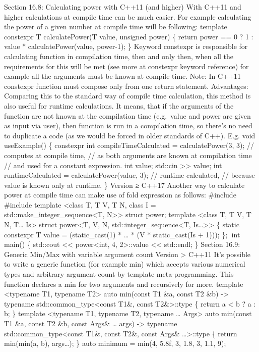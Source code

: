 Section 16.8: Calculating power with C++11 (and higher) With C++11 and
higher calculations at compile time can be much easier. For example
calculating the power of a given number at compile time will be
following: template constexpr T calculatePower(T value, unsigned power)
\{ return power == 0 ? 1 : value * calculatePower(value, power-1); \}
Keyword constexpr is responsible for calculating function in compilation
time, then and only then, when all the requirements for this will be met
(see more at constexpr keyword reference) for example all the arguments
must be known at compile time. Note: In C++11 constexpr function must
compose only from one return statement. Advantages: Comparing this to
the standard way of compile time calculation, this method is also useful
for runtime calculations. It means, that if the arguments of the
function are not known at the compilation time (e.g.~value and power are
given as input via user), then function is run in a compilation time, so
there's no need to duplicate a code (as we would be forced in older
standards of C++). E.g. void useExample() \{ constexpr int
compileTimeCalculated = calculatePower(3, 3); // computes at compile
time, // as both arguments are known at compilation time // and used for
a constant expression. int value; std::cin \textgreater\textgreater{}
value; int runtimeCalculated = calculatePower(value, 3); // runtime
calculated, // because value is known only at runtime. \} Version ≥
C++17 Another way to calculate power at compile time can make use of
fold expression as follows: \#include \#include template \textless class
T, T V, T N, class I = std::make\_integer\_sequence\textless T,
N\textgreater\textgreater{} struct power; template \textless class T, T
V, T N, T\ldots{} Is\textgreater{} struct power\textless T, V, N,
std::integer\_sequence\textless T, Is\ldots\textgreater\textgreater{} \{
static constexpr T value = (static\_cast(1) * \ldots{} * (V *
static\_cast(Is + 1))); \}; int main() \{ std::cout
\textless\textless{} power\textless int, 4, 2\textgreater::value
\textless\textless{} std::endl; \} Section 16.9: Generic Min/Max with
variable argument count Version \textgreater{} C++11 It's possible to
write a generic function (for example min) which accepts various
numerical types and arbitrary argument count by template
meta-programming. This function declares a min for two arguments and
recursively for more. template \textless typename T1, typename
T2\textgreater{} auto min(const T1 \&a, const T2 \&b) -\textgreater{}
typename std::common\_type\textless const T1\&, const
T2\&\textgreater::type \{ return a \textless{} b ? a : b; \} template
\textless typename T1, typename T2, typename \ldots{} Args\textgreater{}
auto min(const T1 \&a, const T2 \&b, const Args\& \ldots{} args)
-\textgreater{} typename std::common\_type\textless const T1\&, const
T2\&, const Args\& \ldots\textgreater::type \{ return min(min(a, b),
args\ldots); \} auto minimum = min(4, 5.8f, 3, 1.8, 3, 1.1, 9);
